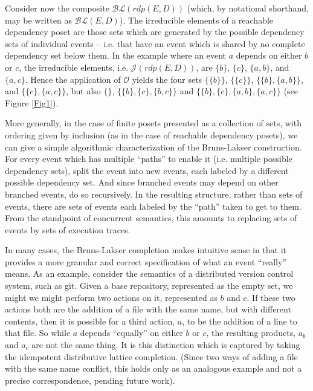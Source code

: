 \documentclass[a4paper,USenglish,cleveref, autoref, thm-restate,authorcolumns]{lipics-v2019}
\newcommand{\Oc}{\mathcal{O}}
\newcommand{\Jc}{\mathcal{J}}
\newcommand{\BLc}{\mathcal{BL}}
\begin{document}
Consider now the composite \(\BLc(rdp(E,D))\) (which, by notational shorthand, may be written as \(\BLc(E,D)\)). The irreducible elements of a reachable dependency poset are those sets which are generated by the possible dependency sets of individual events -- i.e. that have an event which is shared by no complete dependency set below them. In the example where an event \(a\) depends on either \(b\) or \(c\), the irreducible elements, i.e. \(\Jc(rdp(E,D))\), are \(\{b\}\), \(\{c\}\), \(\{a,b\}\), and \(\{a,c\}\). Hence the application of \(\Oc\) yields the four sets \(\{\{b\}\}\), \(\{\{c\}\}\), \(\{\{b\},\{a,b\}\}\), and \(\{\{c\},\{a,c\}\}\), but also \(\{\}\), \(\{\{b\},\{c\},\{b,c\}\}\) and \(\{\{b\},\{c\},\{a,b\},\{a,c\}\}\) (see Figure \ref{Fig1}).

More generally, in the case of finite posets presented as a collection of sets, with ordering given by inclusion (as in the case of reachable dependency posets), we can give a simple algorithmic characterization of the Bruns-Lakser construction. For every event which has multiple ``paths'' to enable it (i.e. multiple possible dependency sets), split the event into new events, each labeled by a different possible dependency set. And since branched events may depend on other branched events, do so recursively. In the resulting structure, rather than sets of events, there are sets of events each labeled by the ``path'' taken to get to them. From the standpoint of concurrent semantics, this amounts to replacing sets of events by sets of execution traces. 

In many cases, the Bruns-Lakser completion makes intuitive sense in that it provides a more granular and correct specification of what an event ``really'' means. As an example, consider the semantics of a distributed version control system, such as git. Given a base repository, represented as the empty set, we might we might perform two actions on it, represented as \(b\) and \(c\). If these two actions both are the addition of a file with the same name, but with different contents, then it is possible for a third action, \(a\), to be the addition of a line to that file. So while \(a\) depends ``equally'' on either \(b\) or \(c\), the resulting products, \(a_b\) and \(a_c\) are not the same thing. It is this distinction which is captured by taking the idempotent distributive lattice completion. (Since two ways of adding a file with the same name conflict, this holds only as an analogous example and not a precise correspondence, pending future work).
\end{document}
